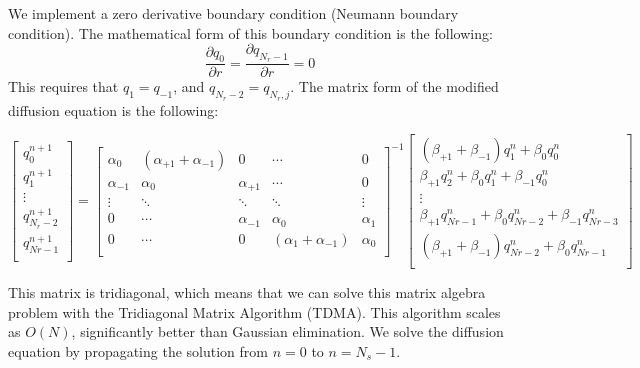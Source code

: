 \documentclass[11pt]{article} %
\begin{document}
We implement a zero derivative boundary condition (Neumann boundary condition). The mathematical form of this boundary condition is the following:
\noindent
\begin{equation}
\dfrac{\partial q_{0}}{\partial r} = \dfrac{\partial q_{N_r-1}}{\partial r} = 0
\end{equation}
\noindent
This requires that $q_{1} = q_{-1}$, and $q_{N_r-2} = q_{N_r,j}$.  The matrix form of the modified diffusion equation is the following:


\[  \begin{bmatrix}
q_{0}^{n+1} \\[0.5em]
q_{1}^{n+1} \\[0.5em]
\vdots \\[0.5em]
q_{N_r-2}^{n+1} \\[0.5em]
q_{Nr-1}^{n+1} \\[0.5em]
\end{bmatrix} = 
%
\begin{bmatrix}
\alpha_0 & (\alpha_{+1}+\alpha_{-1}) & 0 & \cdots & 0 \\[0.5em]
\alpha_{-1} & \alpha_0 & \alpha_{+1} &\cdots &0 \\[0.5em]
\vdots & \ddots & \ddots & \ddots & \vdots \\[0.5em]
0 & \cdots & \alpha_{-1} & \alpha_0 & \alpha_1  \\[0.5em]
0 & \cdots & 0 & (\alpha_1+\alpha_{-1}) & \alpha_0 \\[0.5em]
\end{bmatrix}^{-1} 
%
\begin{bmatrix}
(\beta_{+1}+\beta_{-1})q_{1}^{n} + \beta_0q_{0}^{n} \\[0.5em]
\beta_{+1}q_2^n +\beta_0 q_{1}^{n} + \beta_{-1}q_0^n \\[0.5em]
\vdots \\[0.5em]
\beta_{+1}q_{Nr-1}^n +\beta_0 q_{Nr-2}^{n} + \beta_{-1}q_{Nr-3}^n \\[0.5em]
(\beta_{+1}+\beta_{-1})q_{Nr-2}^{n} + \beta_0q_{Nr-1}^{n} \\[0.5em]
\end{bmatrix}
\]

This matrix is tridiagonal, which means that we can solve this matrix algebra problem with the Tridiagonal Matrix Algorithm (TDMA). This algorithm scales as $O(N)$, significantly better than Gaussian elimination. We solve the diffusion equation by propagating the solution from $n=0$ to $n=N_s-1$.
 
\end{document}
